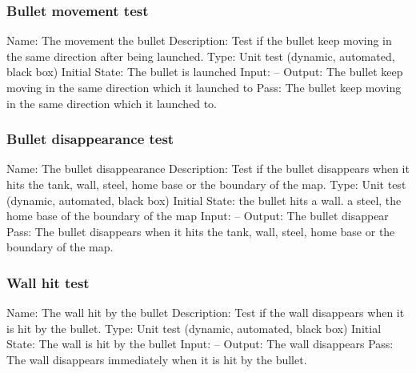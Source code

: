 \documentclass{article}
\begin{document}
\subsubsection{Bullet movement test}
Name:  The movement the bullet\newline
Description: Test if the bullet keep moving in the same direction after being 
launched. \newline
Type: Unit test (dynamic, automated, black box) \newline
Initial State:  The bullet is launched \newline
Input: --\newline
Output: The bullet keep moving in the same direction which it launched to
\newline
Pass:  The bullet keep moving in the same direction which it launched to. 
\newline

\subsubsection{Bullet disappearance test}
Name:  The bullet disappearance \newline
Description: Test if the bullet disappears when it hits the tank, wall, steel,
 home base or the boundary of the map. \newline
Type: Unit test (dynamic, automated, black box) \newline
Initial State:  the bullet hits a wall. a steel, the home base of the boundary 
of the map\newline
Input: --\newline
Output: The bullet disappear\newline
Pass: The bullet disappears when it hits the tank, wall, steel, home base or 
the boundary of the map. \newline

\subsubsection{Wall hit test}
Name:  The wall hit by the bullet\newline
Description: Test if the wall disappears when it is hit by the bullet. \newline
Type: Unit test (dynamic, automated, black box) \newline
Initial State:  The wall is hit by the bullet \newline
Input: --\newline
Output: The wall disappears \newline
Pass:  The wall disappears immediately when it is hit by the bullet. \newline
\end{document}
